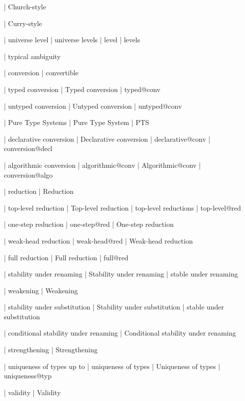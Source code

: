   | Church-style

  | Curry-style

  | universe level
  | universe levels
  | level
  | levels

  | typical ambiguity


  | conversion
  | convertible

  | typed conversion
  | Typed conversion
  | typed@conv

  | untyped conversion
  | Untyped conversion
  | untyped@conv

  | Pure Type Systems
  | Pure Type System
  | PTS

  | declarative conversion
  | Declarative conversion
  | declarative@conv
  | conversion@decl

  | algorithmic conversion
  | algorithmic@conv
  | Algorithmic@conv
  | conversion@algo

  | reduction
  | Reduction

  | top-level reduction
  | Top-level reduction
  | top-level reductions
  | top-level@red

  | one-step reduction
  | one-step@red
  | One-step reduction

  | weak-head reduction
  | weak-head@red
  | Weak-head reduction

  | full reduction
  | Full reduction
  | full@red

  | stability under renaming
  | Stability under renaming
  | stable under renaming

  | weakening
  | Weakening

  | stability under substitution
  | Stability under substitution
  | stable under substitution

  | conditional stability under renaming
  | Conditional stability under renaming


  | strengthening
  | Strengthening

  | uniqueness of types up to
  | uniqueness of types
  | Uniqueness of types
  | uniqueness@typ

  | validity
  | Validity

